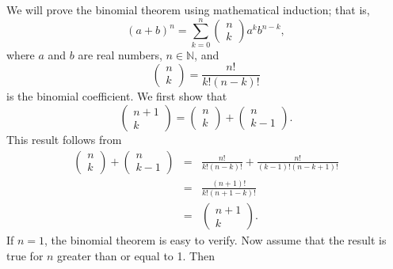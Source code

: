 We will prove the binomial theorem using mathematical induction; that is, 
$$
(a + b)^n = \sum_{k = 0}^{n} \left( \begin{array}{c} n \\ k \end{array} \right) a^k b^{n - k},
$$
where $a$ and $b$ are real numbers, $n \in \mathbb{N}$, and
$$
\left(
\begin{array}{c}
n \\ k
\end{array}
\right)\label{binomial}
= \frac{n!}{k! (n - k)!}\label{factorial}
$$
is the binomial coefficient.  We first show that
$$
\left( \begin{array}{c} n + 1 \\ k \end{array} \right)
=
\left( \begin{array}{c} n \\ k \end{array} \right)
+
\left( \begin{array}{c} n \\ k - 1  \end{array} \right).
$$
This result follows from
\begin{eqnarray*}
\left( \begin{array}{c} n \\ k \end{array} \right)
+
\left( \begin{array}{c} n \\ k - 1  \end{array} \right)
& = &
\frac{n!}{k!(n - k)!}
+\frac{n!}{(k-1)!(n - k + 1)!} \\
& = &
\frac{(n + 1)!}{k!(n + 1 - k)!} \\
& = &
\left( \begin{array}{c} n + 1 \\ k \end{array} \right).
\end{eqnarray*}
If $n = 1$, the binomial theorem is easy to verify. Now assume that the result is true for $n$ greater than or equal to 1.  Then

